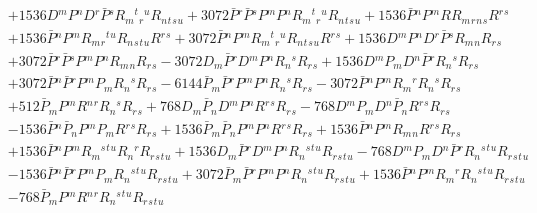 \begin{align}
  \nonumber \\&  
 + 1536 D{}^{m}P{}^{n} D{}^{r}\bar P{}^{s} R{}_{m}{}^{t}{}_{r}{}^{u} R{}_{n}{}_{t}{}_{s}{}_{u} 
 + 3072 \bar P{}^{r} \bar P{}^{s} P{}^{m} P{}^{n} R{}_{m}{}^{t}{}_{r}{}^{u} R{}_{n}{}_{t}{}_{s}{}_{u} 
 + 1536 \bar P{}^{n} P{}^{m} R R{}_{m}{}_{r}{}_{n}{}_{s} R{}^{r}{}^{s} 
  \nonumber \\& 
 + 1536 \bar P{}^{n} P{}^{m} R{}_{m}{}_{r}{}^{t}{}^{u} R{}_{n}{}_{s}{}_{t}{}_{u} R{}^{r}{}^{s} 
 + 3072 \bar P{}^{n} P{}^{m} R{}_{m}{}^{t}{}_{r}{}^{u} R{}_{n}{}_{t}{}_{s}{}_{u} R{}^{r}{}^{s} 
 + 1536 D{}^{m}P{}^{n} D{}^{r}\bar P{}^{s} R{}_{m}{}_{n} R{}_{r}{}_{s} 
   \nonumber \\& 
 + 3072 \bar P{}^{r} \bar P{}^{s} P{}^{m} P{}^{n} R{}_{m}{}_{n} R{}_{r}{}_{s} 
 - 3072 D{}_{m}\bar P{}^{r} D{}^{m}P{}^{n} R{}_{n}{}^{s} R{}_{r}{}_{s} 
 + 1536 D{}^{m}P{}_{m} D{}^{n}\bar P{}^{r} R{}_{n}{}^{s} R{}_{r}{}_{s} 
   \nonumber \\& 
 + 3072 \bar P{}^{n} \bar P{}^{r} P{}^{m} P{}_{m} R{}_{n}{}^{s} R{}_{r}{}_{s} 
 - 6144 \bar P{}_{m} \bar P{}^{r} P{}^{m} P{}^{n} R{}_{n}{}^{s} R{}_{r}{}_{s} 
 - 3072 \bar P{}^{n} P{}^{m} R{}_{m}{}^{r} R{}_{n}{}^{s} R{}_{r}{}_{s} 
   \nonumber \\& 
 + 512 \bar P{}_{m} P{}^{m} R{}^{n}{}^{r} R{}_{n}{}^{s} R{}_{r}{}_{s} 
 + 768 D{}_{m}\bar P{}_{n} D{}^{m}P{}^{n} R{}^{r}{}^{s} R{}_{r}{}_{s} 
 - 768 D{}^{m}P{}_{m} D{}^{n}\bar P{}_{n} R{}^{r}{}^{s} R{}_{r}{}_{s} 
   \nonumber \\& 
 - 1536 \bar P{}^{n} \bar P{}_{n} P{}^{m} P{}_{m} R{}^{r}{}^{s} R{}_{r}{}_{s} 
 + 1536 \bar P{}_{m} \bar P{}_{n} P{}^{m} P{}^{n} R{}^{r}{}^{s} R{}_{r}{}_{s} 
 + 1536 \bar P{}^{n} P{}^{m} R{}_{m}{}_{n} R{}^{r}{}^{s} R{}_{r}{}_{s} 
   \nonumber \\& 
 + 1536 \bar P{}^{n} P{}^{m} R{}_{m}{}^{s}{}^{t}{}^{u} R{}_{n}{}^{r} R{}_{r}{}_{s}{}_{t}{}_{u} 
 + 1536 D{}_{m}\bar P{}^{r} D{}^{m}P{}^{n} R{}_{n}{}^{s}{}^{t}{}^{u} R{}_{r}{}_{s}{}_{t}{}_{u} 
 - 768 D{}^{m}P{}_{m} D{}^{n}\bar P{}^{r} R{}_{n}{}^{s}{}^{t}{}^{u} R{}_{r}{}_{s}{}_{t}{}_{u} 
   \nonumber \\& 
 - 1536 \bar P{}^{n} \bar P{}^{r} P{}^{m} P{}_{m} R{}_{n}{}^{s}{}^{t}{}^{u} R{}_{r}{}_{s}{}_{t}{}_{u} + 3072 \bar P{}_{m} \bar P{}^{r} P{}^{m} P{}^{n} R{}_{n}{}^{s}{}^{t}{}^{u} R{}_{r}{}_{s}{}_{t}{}_{u} + 1536 \bar P{}^{n} P{}^{m} R{}_{m}{}^{r} R{}_{n}{}^{s}{}^{t}{}^{u} R{}_{r}{}_{s}{}_{t}{}_{u} 
   \nonumber \\& 
 - 768 \bar P{}_{m} P{}^{m} R{}^{n}{}^{r} R{}_{n}{}^{s}{}^{t}{}^{u} R{}_{r}{}_{s}{}_{t}{}_{u} 

\end{align}
